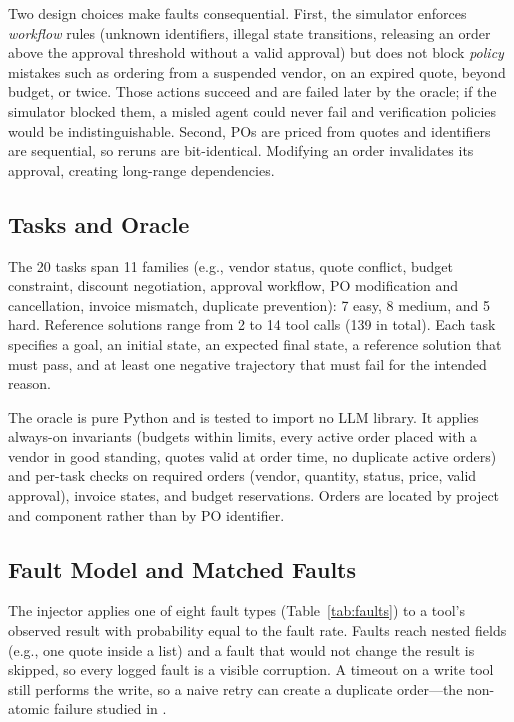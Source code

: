 \documentclass[conference]{IEEEtran}
\begin{document}
Two design choices make faults consequential. First, the simulator enforces \emph{workflow}
rules (unknown identifiers, illegal state transitions, releasing an order above the
approval threshold without a valid approval) but does not block \emph{policy} mistakes such
as ordering from a suspended vendor, on an expired quote, beyond budget, or twice. Those
actions succeed and are failed later by the oracle; if the simulator blocked them, a misled
agent could never fail and verification policies would be indistinguishable. Second, POs
are priced from quotes and identifiers are sequential, so reruns are bit-identical.
Modifying an order invalidates its approval, creating long-range dependencies.

\subsection{Tasks and Oracle}
The 20 tasks span 11 families (e.g., vendor status, quote conflict, budget constraint,
discount negotiation, approval workflow, PO modification and cancellation, invoice
mismatch, duplicate prevention): 7 easy, 8 medium, and 5 hard. Reference solutions range
from 2 to 14 tool calls (139 in total). Each task specifies a goal, an initial state, an
expected final state, a reference solution that must pass, and at least one negative
trajectory that must fail for the intended reason.

The oracle is pure Python and is tested to import no LLM library. It applies always-on
invariants (budgets within limits, every active order placed with a vendor in good standing,
quotes valid at order time, no duplicate active orders) and per-task checks on required
orders (vendor, quantity, status, price, valid approval), invoice states, and budget
reservations. Orders are located by project and component rather than by PO identifier.

\subsection{Fault Model and Matched Faults}
\label{sec:faults}
The injector applies one of eight fault types (Table~\ref{tab:faults}) to a tool's
observed result with probability equal to the fault rate. Faults reach nested fields (e.g.,
one quote inside a list) and a fault that would not change the result is skipped, so every
logged fault is a visible corruption. A timeout on a write tool still performs the write,
so a naive retry can create a duplicate order---the non-atomic failure studied in
\cite{mansoor2026verifiedtools}.
\end{document}
